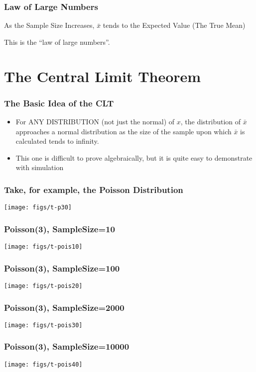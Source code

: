 \documentclass[10pt,english]{beamer}
\begin{document}
\begin{frame}
 \frametitle{Law of Large Numbers}

As the Sample Size Increases, $\bar{x}$ tends to the Expected Value
(The True Mean)

This is the {}``law of large numbers''. 

\end{frame}

\section{The Central Limit Theorem}

\begin{frame}
  \frametitle{The Basic Idea of the CLT}
  \begin{itemize}
    \item For ANY DISTRIBUTION (not just the normal) of $x$, the
      distribution of $\bar{x}$ approaches a normal distribution
      as the size of the sample upon which $\bar{x}$ is calculated
      tends to infinity.
    \item This one is difficult to prove algebraically, but it is
      quite easy to demonstrate with simulation
  \end{itemize}
\end{frame}


\begin{frame}
 \frametitle{Take, for example, the Poisson Distribution}

\texttt{[image: figs/t-p30]}
\end{frame}






\begin{frame}
 \frametitle{Poisson(3), SampleSize=10 }
 \texttt{[image: figs/t-pois10]}
\end{frame}


\begin{frame}
 \frametitle{Poisson(3), SampleSize=100 }
 \texttt{[image: figs/t-pois20]}
\end{frame}


\begin{frame}
 \frametitle{Poisson(3), SampleSize=2000 }

 \texttt{[image: figs/t-pois30]}
\end{frame}


\begin{frame}
 \frametitle{Poisson(3), SampleSize=10000 }
 \texttt{[image: figs/t-pois40]}
\end{frame}
\end{document}
